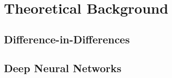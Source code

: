 \section{Theoretical Background}
\subsection{Difference-in-Differences}
\subsection{Deep Neural Networks}
